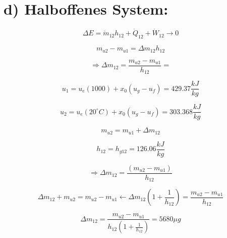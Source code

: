 \section*{d) Halboffenes System:}

\[
\Delta E = \dot{m}_{12} h_{12} + \dot{Q}_{12} + \dot{W}_{12} \rightarrow 0
\]

\[
m_{u2} - m_{u1} = \Delta m_{12} h_{12}
\]

\[
\Rightarrow \Delta m_{12} = \frac{m_{u2} - m_{u1}}{h_{12}} = 
\]

\[
u_1 = u_e(1000) + x_0 (u_g - u_f) = 429.37 \frac{kJ}{kg}
\]

\[
u_2 = u_e(20^\circ C) + x_0 (u_g - u_f) = 303.368 \frac{kJ}{kg}
\]

\[
m_{u2} = m_{u1} + \Delta m_{12}
\]

\[
h_{12} = h_{g12} = 126.06 \frac{kJ}{kg}
\]

\[
\Rightarrow \Delta m_{12} = \frac{(m_{u2} - m_{u1})}{h_{12}}
\]

\[
\Delta m_{12} + m_{u2} = m_{u2} - m_{u1} \leftarrow \Delta m_{12} \left(1 + \frac{1}{h_{12}}\right) = \frac{m_{u2} - m_{u1}}{h_{12}}
\]

\[
\Delta m_{12} = \frac{m_{u2} - m_{u1}}{h_{12} \left(1 + \frac{1}{h_{12}}\right)} = 5680 \mu g
\]